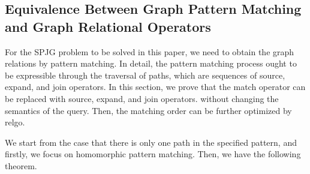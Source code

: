 

\iffalse
\subsection{Equivalence Between Graph Pattern Matching and Graph Relational Operators}
\label{sec:proof-gpm-gro}

For the SPJG problem to be solved in this paper, we need to obtain the graph relations by pattern matching.
In detail, the pattern matching process ought to be expressible through the traversal of paths, which are sequences of source, expand, and join operators.
In this section, we prove that the match operator can be replaced with source, expand, and join operators. without changing the semantics of the query.
Then, the matching order can be further optimized by relgo.

We start from the case that there is only one path in the specified pattern, and firstly, we focus on homomorphic pattern matching.
Then, we have the following theorem.

